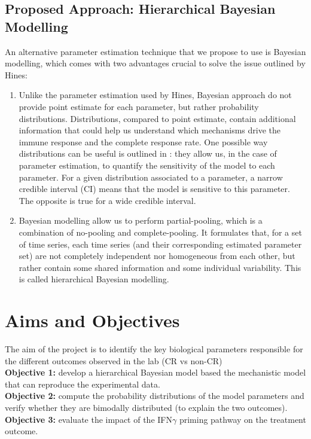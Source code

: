 \documentclass[11pt]{article}
\begin{document}
\subsection{Proposed Approach: Hierarchical Bayesian Modelling}

An alternative parameter estimation technique that we propose to use is Bayesian modelling, which comes with two advantages crucial to solve the issue outlined by Hines:
\begin{enumerate}
    \item Unlike the parameter estimation used by Hines, Bayesian approach do not provide point estimate for each parameter, but rather probability distributions. Distributions, compared to point estimate, contain additional information that could help us understand which mechanisms drive the immune response and the complete response rate. One possible way distributions can be useful is outlined in \cite{toniPHD}: they allow us, in the case of parameter estimation, to quantify the sensitivity of the model to each parameter. For a given distribution associated to a parameter, a narrow credible interval (CI) means that the model is sensitive to this parameter. The opposite is true for a wide credible interval.  
    \item Bayesian modelling allow us to perform partial-pooling, which is a combination of no-pooling and complete-pooling. It formulates that, for a set of time series, each time series (and their corresponding estimated parameter set) are not completely independent nor homogeneous from each other, but rather contain some shared information and some individual variability. This is called hierarchical Bayesian modelling.
\end{enumerate}

\section{Aims and Objectives}
\noindent The aim of the project is to identify the key biological parameters responsible for the different outcomes observed in the lab (CR vs non-CR)\\[8pt]
\textbf{Objective 1:} develop a hierarchical Bayesian model based the mechanistic model that can reproduce the experimental data.\\ 
\textbf{Objective 2:} compute the probability distributions of the model parameters and verify whether they are bimodally distributed (to explain the two outcomes).\\ 
\textbf{Objective 3:} evaluate the impact of the IFN$\gamma$ priming pathway on the treatment outcome. 
\end{document}

